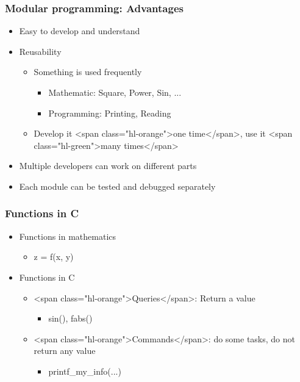 \documentclass{../c-lecture}
\begin{document}
\begin{frame}
  \frametitle{Modular programming: Advantages}
  \begin{itemize}
    \item Easy to develop and understand
    \item Reusability
    \begin{itemize}
      \item Something is used frequently
      \begin{itemize}
        \item Mathematic: Square, Power, Sin, ...
        \item Programming: Printing, Reading
      \end{itemize}
      \item
        Develop it <span class="hl-orange">one time</span>, use it
        <span class="hl-green">many times</span>

    \end{itemize}
    \item Multiple developers can work on different parts
    \item Each module can be tested and debugged separately
  \end{itemize}
\end{frame}
\begin{frame}
  \frametitle{Functions in C}
  \begin{itemize}
    \item Functions in mathematics
    \begin{itemize}
      \item z = f(x, y)
    \end{itemize}
    \item Functions in C
    \begin{itemize}
      \item <span class="hl-orange">Queries</span>: Return a value
      \begin{itemize}
        \item sin(), fabs()
      \end{itemize}
      \item
        <span class="hl-orange">Commands</span>: do some tasks, do not return
        any value

      \begin{itemize}
        \item printf_my_info(...)
      \end{itemize}
    \end{itemize}
  \end{itemize}
\end{frame}
\end{document}
